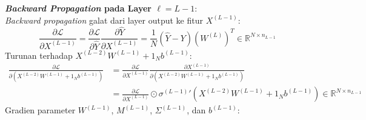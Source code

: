 \documentclass[11pt,a4paper]{article}
\def\mathbf#1{#1}%
\theoremstyle{plain}
\theoremstyle{definition}
\theoremstyle{remark}
\begin{document}
\noindent \textbf{\textit{Backward Propagation} pada Layer $\ell = L-1$}: \\
\textit{Backward propagation} galat dari layer output ke fitur $X^{(L-1)}$:
\begin{equation}
    \frac{\partial \mathcal{L}}{\partial X^{(L-1)}} = \frac{\partial \mathcal{L}}{\partial \hat{Y}} \frac{\partial \hat{Y}}{\partial X^{(L-1)}} = \frac{1}{N} \left( \hat{Y} - Y \right) \left( W^{(L)} \right)^T \in \mathbb{R}^{N \times n_{L-1}} \label{eq:dL_dXLprev_reparam}
\end{equation}
Turunan terhadap $X^{(L-2)} W^{(L-1)} + \mathbf{1}_N \mathbf{b}^{(L-1)}$:
\begin{align}
    \frac{\partial \mathcal{L}}{\partial \left( X^{(L-2)} W^{(L-1)} + \mathbf{1}_N \mathbf{b}^{(L-1)} \right)} &= \frac{\partial \mathcal{L}}{\partial X^{(L-1)}} \frac{\partial X^{(L-1)}}{\partial \left( X^{(L-2)} W^{(L-1)} + \mathbf{1}_N \mathbf{b}^{(L-1)} \right)} \nonumber \\
    &= \frac{\partial \mathcal{L}}{\partial X^{(L-1)}} \odot {\sigma^{(L-1)}}'\!\left( X^{(L-2)} W^{(L-1)} + \mathbf{1}_N \mathbf{b}^{(L-1)} \right) \in \mathbb{R}^{N \times n_{L-1}}
\end{align}
Gradien parameter $W^{(L-1)}$, $M^{(L-1)}$, $\Sigma^{(L-1)}$, dan $\mathbf{b}^{(L-1)}$:
\end{document}
